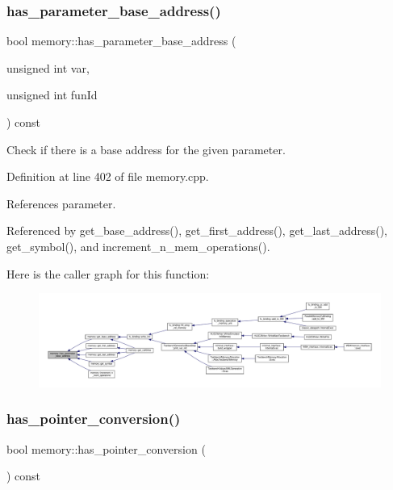 \subsubsection{\texorpdfstring{has\+\_\+parameter\+\_\+base\+\_\+address()}{has\_parameter\_base\_address()}}
{\footnotesize\ttfamily bool memory\+::has\+\_\+parameter\+\_\+base\+\_\+address (\begin{DoxyParamCaption}\item[{unsigned int}]{var,  }\item[{unsigned int}]{fun\+Id }\end{DoxyParamCaption}) const}



Check if there is a base address for the given parameter. 



Definition at line 402 of file memory.\+cpp.



References parameter.



Referenced by get\+\_\+base\+\_\+address(), get\+\_\+first\+\_\+address(), get\+\_\+last\+\_\+address(), get\+\_\+symbol(), and increment\+\_\+n\+\_\+mem\+\_\+operations().

Here is the caller graph for this function\+:
\nopagebreak
\begin{figure}[H]
\begin{center}
\leavevmode
\includegraphics[width=350pt]{d8/d99/classmemory_af2a8ffe8b46caad910fa15fd4b682fed_icgraph}
\end{center}
\end{figure}
\mbox{\label{classmemory_a433d1c32eaf44fd28694cb612a1330f0}} 
\subsubsection{\texorpdfstring{has\+\_\+pointer\+\_\+conversion()}{has\_pointer\_conversion()}}
{\footnotesize\ttfamily bool memory\+::has\+\_\+pointer\+\_\+conversion (\begin{DoxyParamCaption}{ }\end{DoxyParamCaption}) const\hspace{0.3cm}{\ttfamily [inline]}}



